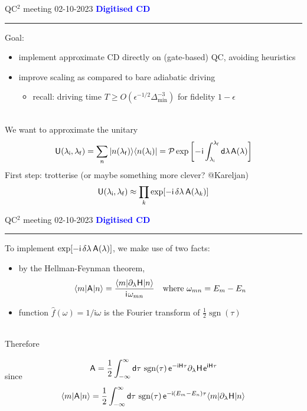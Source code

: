 \documentclass{beamer}
\def\lbt{\small QC$^2$ meeting 02-10-2023} %
\DeclareMathOperator{\sgn}{sgn}
\def\mt#1{\kern0.025em\mathsf{#1}\kern0.025em}
\def\d{\mathsf d}
\def\e{\mathsf e}
\def\i{\mathsf i}
\def\lambdai{\lambda_{\sf i}}
\def\lambdaf{\lambda_{\sf f}}
\def\A{\mt A}
\def\H{\mt H}
\def\+{\kern0.0833em}
\newenvironment{dia}[2]
{
	\begin{frame}
	\vspace{1mm}
	{\small #1}
	\hfill
    {\small\bf\textcolor{blue}{#2}}
	\vspace{3mm}
	\hrule
	\bigskip
}
{
	\vfill
	\end{frame}
}
\begin{document}
\begin{dia}{\lbt}{Digitised CD}
Goal:
\begin{itemize}
    \item implement approximate CD directly on (gate-based) QC, avoiding heuristics
    \item improve scaling as compared to bare adiabatic driving
    \begin{itemize}
        \item recall: driving time $T \geq O(\epsilon^{-1/2}\Delta_{\min}^{-3})$ for fidelity $1 - \epsilon$
    \end{itemize}
\end{itemize}
$ $\\[-2mm]
We want to approximate the unitary
\begin{align*}
    \mt U(\lambdai, \lambdaf) = \sum_n \ket{n(\lambdaf)}\bra{n(\lambdai)} = \mathcal P \exp \bigg[ \! -\!\i \int_{\lambdai}^{\lambdaf} \d\lambda \+ \mt A(\lambda) \bigg]
\end{align*} \pause
First step: trotterise (or maybe something more clever? @Kareljan)
\begin{align*}
    \mt U(\lambdai, \lambdaf) \approx \prod_k \exp[-\i \, \delta\lambda \, \A(\lambda_k)]
\end{align*}
\vspace{-1.4cm}
\end{dia}

\begin{dia}{\lbt}{Digitised CD}
To implement $\exp[-\i \, \delta\lambda \, \A(\lambda)]$, we make use of two facts: \pause
\begin{itemize}
    \item by the Hellman-Feynman theorem,
    \begin{align*}
        \bra m \A \ket n = \frac{\bra m \partial_\lambda\H \ket n}{\i \+ \omega_{mn}} \quad \text{where } \omega_{mn} = E_m - E_n
    \end{align*}
    \item function $\hat f(\omega) = 1/\i\omega$ is the Fourier transform of $\frac12 \sgn(\tau)$ \pause
\end{itemize} 
$ $\\[-4mm]
Therefore
\begin{align*}
    \A = \frac12 \int_{-\infty}^\infty \d\tau \, \sgn(\tau) \, \e^{-\i\H\tau} \partial_\lambda \H \+ \e^{\i\H\tau} \\[-8mm]
\end{align*} \pause
since
\begin{align*}
    \bra m \A \ket n = \frac12 \int_{-\infty}^\infty \d\tau \, \sgn(\tau) \, \e^{-\i(E_m - E_n)\tau} \bra m \partial_\lambda \H \ket n
\end{align*}
\vspace{-1.4cm}
\end{dia}
\end{document}
